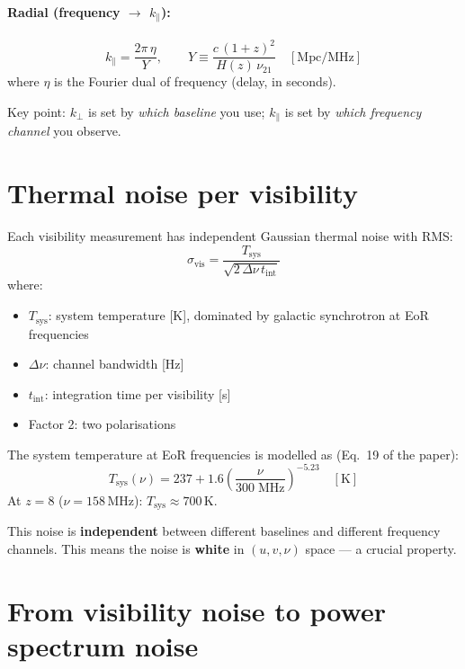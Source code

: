\documentclass[11pt,a4paper]{article}
\newcommand{\kperp}{k_\perp}
\newcommand{\kpar}{k_\parallel}
\newcommand{\Tsys}{T_\mathrm{sys}}
\begin{document}
\paragraph{Radial (frequency $\to$ $\kpar$):}
\begin{equation}
    \kpar = \frac{2\pi\, \eta}{Y}, \qquad
    Y \equiv \frac{c\,(1+z)^2}{H(z)\,\nu_{21}} \quad [\mathrm{Mpc/MHz}]
\end{equation}
where $\eta$ is the Fourier dual of frequency (delay, in seconds).

Key point: $\kperp$ is set by \emph{which baseline} you use; $\kpar$ is set by \emph{which frequency channel} you observe.

\section{Thermal noise per visibility}

Each visibility measurement has independent Gaussian thermal noise with RMS:
\begin{equation}
    \sigma_\mathrm{vis} = \frac{\Tsys}{\sqrt{2\,\Delta\nu\,t_\mathrm{int}}}
\end{equation}
where:
\begin{itemize}
    \item $\Tsys$: system temperature [K], dominated by galactic synchrotron at EoR frequencies
    \item $\Delta\nu$: channel bandwidth [Hz]
    \item $t_\mathrm{int}$: integration time per visibility [s]
    \item Factor 2: two polarisations
\end{itemize}

The system temperature at EoR frequencies is modelled as (Eq.~19 of the paper):
\begin{equation}
    \Tsys(\nu) = 237 + 1.6\left(\frac{\nu}{300\;\mathrm{MHz}}\right)^{-5.23} \quad [\mathrm{K}]
\end{equation}
At $z=8$ ($\nu = 158$\,MHz): $\Tsys \approx 700$\,K.

This noise is \textbf{independent} between different baselines and different frequency channels. This means the noise is \textbf{white} in $(u,v,\nu)$ space --- a crucial property.

\section{From visibility noise to power spectrum noise}
\end{document}
